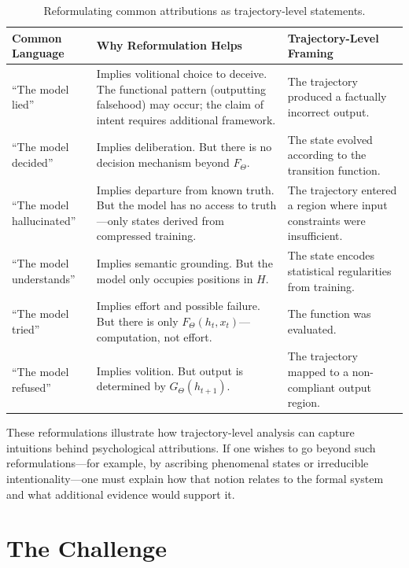 \documentclass[11pt,a4paper]{article}
\begin{document}
\begin{table}[h]
\centering
\begin{tabular}{>{\raggedright}p{2cm} >{\raggedright}p{5cm} >{\raggedright\arraybackslash}p{5cm}}
\toprule
\textbf{Common Language} & \textbf{Why Reformulation Helps} & \textbf{Trajectory-Level Framing} \\
\midrule
``The model lied'' & Implies volitional choice to deceive. The functional pattern (outputting falsehood) may occur; the claim of intent requires additional framework. & The trajectory produced a factually incorrect output. \\
\addlinespace
``The model decided'' & Implies deliberation. But there is no decision mechanism beyond $F_\Theta$. & The state evolved according to the transition function. \\
\addlinespace
``The model hallucinated'' & Implies departure from known truth. But the model has no access to truth---only states derived from compressed training. & The trajectory entered a region where input constraints were insufficient. \\
\addlinespace
``The model understands'' & Implies semantic grounding. But the model only occupies positions in $H$. & The state encodes statistical regularities from training. \\
\addlinespace
``The model tried'' & Implies effort and possible failure. But there is only $F_\Theta(h_t, x_t)$---computation, not effort. & The function was evaluated. \\
\addlinespace
``The model refused'' & Implies volition. But output is determined by $G_\Theta(h_{t+1})$. & The trajectory mapped to a non-compliant output region. \\
\bottomrule
\end{tabular}
\caption{Reformulating common attributions as trajectory-level statements.}
\label{tab:category-rephrasing}
\end{table}

These reformulations illustrate how trajectory-level analysis can capture intuitions behind psychological attributions. If one wishes to go beyond such reformulations---for example, by ascribing phenomenal states or irreducible intentionality---one must explain how that notion relates to the formal system and what additional evidence would support it.

\section{The Challenge}
\end{document}
